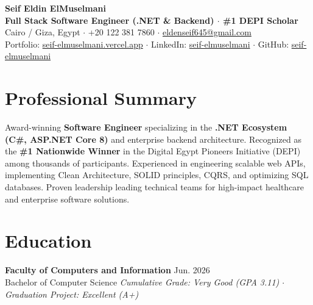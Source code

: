 \documentclass[11pt,a4paper]{article}
\begin{document}
\begin{center}
    {\huge \textbf{Seif Eldin ElMuselmani}} \\ \vspace{1.5mm}
    {\large \textbf{Full Stack Software Engineer (.NET \& Backend) $\cdot$ \#1 DEPI Scholar}} \\ \vspace{1mm}
    Cairo / Giza, Egypt $\cdot$ +20 122 381 7860 $\cdot$ \href{mailto:eldenseif645@gmail.com}{eldenseif645@gmail.com} \\
    Portfolio: \href{https://seif-elmuselmani.vercel.app}{seif-elmuselmani.vercel.app} $\cdot$ LinkedIn: \href{https://linkedin.com/in/seif-elmuselmani}{seif-elmuselmani} $\cdot$ GitHub: \href{https://github.com/seif-elmuselmani}{seif-elmuselmani}
\end{center}

\vspace{-2.5mm}
\section{Professional Summary}
Award-winning \textbf{Software Engineer} specializing in the \textbf{.NET Ecosystem (C\#, ASP.NET Core 8)} and enterprise backend architecture. Recognized as the \textbf{\#1 Nationwide Winner} in the Digital Egypt Pioneers Initiative (DEPI) among thousands of participants. Experienced in engineering scalable web APIs, implementing Clean Architecture, SOLID principles, CQRS, and optimizing SQL databases. Proven leadership leading technical teams for high-impact healthcare and enterprise software solutions.

\section{Education}
\textbf{Faculty of Computers and Information} \hfill Jun. 2026 \\
Bachelor of Computer Science \hfill \textit{Cumulative Grade: Very Good (GPA 3.11) $\cdot$ Graduation Project: Excellent (A+)}

\end{document}
